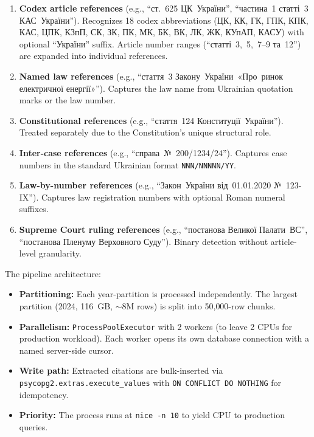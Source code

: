 \documentclass[11pt]{article}
\begin{document}
\begin{enumerate}[leftmargin=*, nosep]
  \item \textbf{Codex article references} (e.g., ``ст.~625 ЦК~України'', ``частина~1 статті~3 КАС~України'').
    Recognizes 18 codex abbreviations (ЦК, КК, ГК, ГПК, КПК, КАС, ЦПК, КЗпП, СК, ЗК, ПК, МК, БК, ВК, ЛК, ЖК, КУпАП, КАСУ) with optional ``України'' suffix.
    Article number ranges (``статті~3,~5,~7--9 та~12'') are expanded into individual references.

  \item \textbf{Named law references} (e.g., ``стаття~3 Закону~України~«Про~ринок електричної енергії»'').
    Captures the law name from Ukrainian quotation marks or the law number.

  \item \textbf{Constitutional references} (e.g., ``стаття~124 Конституції~України'').
    Treated separately due to the Constitution's unique structural role.

  \item \textbf{Inter-case references} (e.g., ``справа~№~200/1234/24'').
    Captures case numbers in the standard Ukrainian format \texttt{NNN/NNNNN/YY}.

  \item \textbf{Law-by-number references} (e.g., ``Закон~України від~01.01.2020 №~123-IX'').
    Captures law registration numbers with optional Roman numeral suffixes.

  \item \textbf{Supreme Court ruling references} (e.g., ``постанова Великої Палати~ВС'', ``постанова Пленуму Верховного Суду'').
    Binary detection without article-level granularity.
\end{enumerate}

The pipeline architecture:

\begin{itemize}[leftmargin=*, nosep]
  \item \textbf{Partitioning:} Each year-partition is processed independently. The largest partition (2024, 116~GB, ${\sim}$8M rows) is split into 50{,}000-row chunks.
  \item \textbf{Parallelism:} \texttt{ProcessPoolExecutor} with 2 workers (to leave 2 CPUs for production workload). Each worker opens its own database connection with a named server-side cursor.
  \item \textbf{Write path:} Extracted citations are bulk-inserted via \texttt{psycopg2.extras.execute\_values} with \texttt{ON CONFLICT DO NOTHING} for idempotency.
  \item \textbf{Priority:} The process runs at \texttt{nice~-n~10} to yield CPU to production queries.
\end{itemize}
\end{document}
